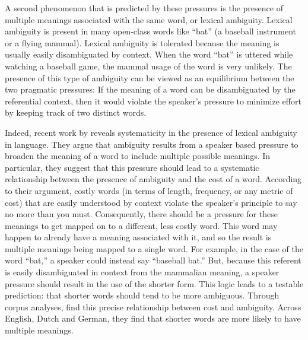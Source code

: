 \documentclass[man]{apa2}
\begin{document}
A second phenomenon that is predicted by these pressures is the presence of multiple meanings associated with the same word, or lexical ambiguity. Lexical ambiguity is present in  many open-class words like ``bat'' (a baseball instrument or a flying mammal). Lexical ambiguity is tolerated because the meaning is usually easily disambiguated by context. When the word ``bat'' is uttered while watching a baseball game, the mammal usage of the word is very unlikely. The presence of this type of ambiguity can be viewed as an equilibrium between the two pragmatic pressures: If the meaning of a word can be disambiguated by the referential context, then it would violate the speaker's pressure to minimize effort by keeping track of two distinct words.

Indeed, recent work by  reveals systematicity in the presence of lexical ambiguity in language. They argue that ambiguity results from a speaker based pressure to broaden the meaning of a word to include multiple possible meanings. In particular, they suggest that this pressure should lead to a systematic relationship between the presence of ambiguity and the cost of a word. According to their argument, costly words (in terms of length, frequency, or any metric of cost) that are easily understood by context violate the speaker's principle to say no more than you must. Consequently, there should be a pressure for these meanings to get mapped on to a different, less costly word. This word may happen to already have a meaning associated with it, and so the result is multiple meanings being mapped to a single word. For example, in the case of the word ``bat,'' a speaker could instead say ``baseball bat.'' But, because this referent is easily disambiguated in context from the mammalian meaning, a speaker pressure should result in the use of the shorter form. This logic leads to a testable prediction: that shorter words should tend to be more ambiguous. Through corpus analyses,  find this precise relationship between cost and ambiguity. Across English, Dutch and German, they find that shorter words are more likely to have multiple meanings.
\end{document}
